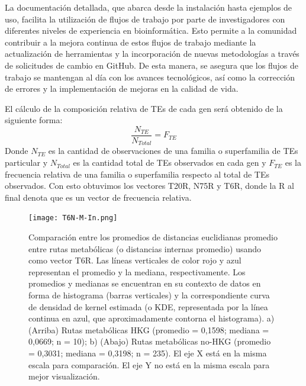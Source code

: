 \documentclass[12pt]{article}
\begin{document}
La documentación detallada, que abarca desde la instalación hasta ejemplos de uso, facilita la utilización de flujos de trabajo por parte de investigadores con diferentes niveles de experiencia en bioinformática. Esto permite a la comunidad contribuir a la mejora continua de estos flujos de trabajo mediante la actualización de herramientas y la incorporación de nuevas metodologías a través de solicitudes de cambio en GitHub. De esta manera, se asegura que los flujos de trabajo se mantengan al día con los avances tecnológicos, así como la corrección de errores y la implementación de mejoras en la calidad de vida.


\newpage
El cálculo de la composición relativa de TEs de cada gen será obtenido de la siguiente forma:
\begin{equation}
    \frac{N_{TE}}{N_{Total}} = F_{TE}
    \label{eq:freqRelativa}
\end{equation}
Donde $N_{TE}$ es la cantidad de observaciones de una familia o superfamilia de TEs particular y $N_{Total}$ es la cantidad total de TEs observados en cada gen y $F_{TE}$ es la frecuencia relativa de una familia o superfamilia respecto al total de TEs observados. Con esto obtuvimos los vectores T20R, N75R y T6R, donde la R al final denota que es un vector de frecuencia relativa.

\begin{figure}[ht!]
    \centering
    \small
    \vspace*{-10mm}
    \texttt{[image: T6N-M-In.png]}
    \caption{Comparación entre los promedios de distancias euclidianas promedio entre rutas metabólicas (o distancias internas promedio) usando como vector T6R. Las líneas verticales de color rojo y azul representan el promedio y la mediana, respectivamente. Los promedios y medianas se encuentran en su contexto de datos en forma de histograma (barras verticales) y la correspondiente curva de densidad de kernel estimada (o KDE, representada por la línea continua en azul, que aproximadamente contorna el histograma). a) (Arriba) Rutas metabólicas HKG (promedio = 0,1598; mediana = 0,0669; n = 10); b) (Abajo) Rutas metabólicas no-HKG (promedio = 0,3031; mediana = 0,3198; n = 235). El eje X está en la misma escala para comparación. El eje Y no está en la misma escala para mejor visualización.}
    \label{T6R-M-In}
\end{figure}
\end{document}
